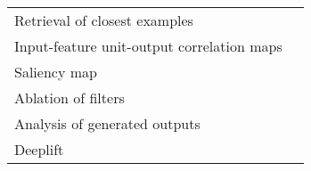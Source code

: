 \begin{tabular}{ll}
Retrieval of closest examples                          &                                                                                                                                                                                  \cite{Deiss2018} \\
Input-feature unit-output correlation maps             &                                                                                                                                                                          \cite{Schirrmeister2017} \\
Saliency map                                           &                                                                                                                                                                               \cite{Vilamala2017} \\
Ablation of filters                                    &                                                                                                                                                                                \cite{Lawhern2018} \\
Analysis of generated outputs                          &                                                                                                                                                                               \cite{Hartmann2018} \\
Deeplift                                               &                                                                                                                                                                                \cite{Lawhern2018} \\
\bottomrule
\end{tabular}
